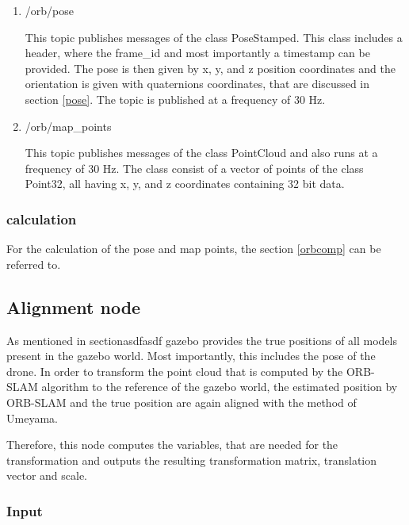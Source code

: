 	\begin{enumerate}
	\item{/orb/pose}
	
	This topic publishes messages of the class PoseStamped. This class includes a header, where the frame\_id and most importantly a timestamp can be provided. 
	The pose is then given by x, y, and z position coordinates and the orientation is given with quaternions coordinates, that are discussed in section \ref{pose}. 
	The topic is published at a frequency of 30 Hz. 
	
	\item{/orb/map\_points}
	
	This topic publishes messages of the class PointCloud and also runs at a frequency of 30 Hz. The class consist of a vector of points of the 
	class Point32, all having x, y, and z coordinates containing 32 bit data. 
	 

	\end{enumerate}
	
	\subsubsection{calculation}
	
	For the calculation of the pose and map points, the section \ref{orbcomp} can be referred to. 
	

	
	\subsection{Alignment node}
	
	As mentioned in section{asdfasdf} gazebo provides the true positions of all models present in the gazebo world. Most importantly, this includes 
	the pose of the drone. In order to transform the point cloud that is computed by the ORB-SLAM algorithm to the reference of the gazebo world, the estimated 
	position by ORB-SLAM and the true position are again aligned with the method of Umeyama. 
	
	Therefore, this node computes the variables, that are needed for the transformation and outputs the resulting transformation matrix, translation vector and scale. 
	
	
	\subsubsection{Input}
	
